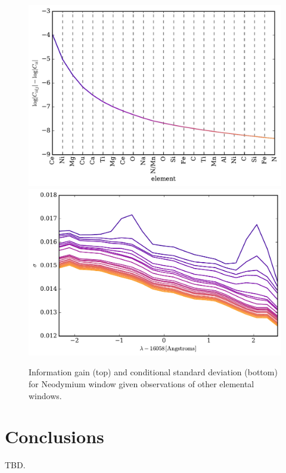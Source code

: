 \documentclass[a4paper,fleqn,usenatbib]{mnras}
\begin{document}
\begin{figure}
	\includegraphics[width=\columnwidth]{apogee_centers_subset2_ce_nd_29502_spc_nd_inf_gain.pdf}
	\includegraphics[width=\columnwidth]{apogee_centers_subset2_ce_nd_29502_spc_nd_conditional_stddevs.pdf}
    \caption{Information gain (top) and conditional standard deviation (bottom) for Neodymium window given observations of other elemental windows.}
    \label{fig:nd_information}
\end{figure}


\section{Conclusions}

TBD.
\end{document}

